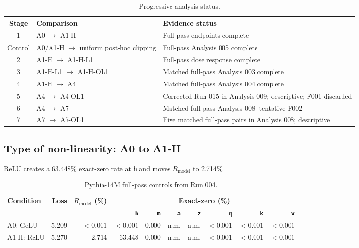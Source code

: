 \documentclass[10pt,a4paper]{article}
\newcommand{\Rmodel}{\ensuremath{R_{\mathrm{model}}}}
\newcommand{\code}[1]{\texttt{#1}}
\begin{document}
{\small
\begin{table}[htbp]
\centering
\caption{Progressive analysis status.}
\label{tab:analysis-status}
\begin{tabularx}{\textwidth}{@{}c p{43mm}Y@{}}
\toprule
\textbf{Stage} & \textbf{Comparison} & \textbf{Evidence status} \\
 & A0 $\rightarrow$ A1-H & Full-pass endpoints complete \\
Control & A0/A1-H $\rightarrow$ uniform post-hoc clipping & Full-pass Analysis 005 complete \\
2 & A1-H $\rightarrow$ A1-H-L1 & Full-pass dose response complete \\
3 & A1-H-L1 $\rightarrow$ A1-H-OL1 & Matched full-pass Analysis 003 complete \\
4 & A1-H $\rightarrow$ A4 & Matched full-pass Analysis 004 complete \\
5 & A4 $\rightarrow$ A4-OL1 & Corrected Run 015 in Analysis 009; descriptive; F001 discarded \\
6 & A4 $\rightarrow$ A7 & Matched full-pass Analysis 008; tentative F002 \\
7 & A7 $\rightarrow$ A7-OL1 & Five matched full-pass pairs in Analysis 008; descriptive \\
\bottomrule
\end{tabularx}
\end{table}}
\FloatBarrier

\subsection{Type of non-linearity: A0 to A1-H}

ReLU creates a 63.448\% exact-zero rate at \code{h} and moves \Rmodel{} to 2.714\%.

{\small
\begin{table}[htbp]
\centering
\caption{Pythia-14M full-pass controls from Run 004.}
\setlength{\tabcolsep}{2.2pt}
\begin{tabular*}{\textwidth}{@{\extracolsep{\fill}}l*{9}{r}@{}}
\toprule
\textbf{Condition} & \textbf{Loss} & \textbf{\Rmodel{} (\%)} & \multicolumn{7}{c}{\textbf{Exact-zero (\%)}} \\
\cmidrule(l){4-10}
& & & \textbf{\code{h}} & \textbf{\code{m}} & \textbf{\code{a}} & \textbf{\code{z}} & \textbf{\code{q}} & \textbf{\code{k}} & \textbf{\code{v}} \\
\midrule
A0: GeLU & 5.209 & $<0.001$ & $<0.001$ & 0.000 & n.m. & n.m. & $<0.001$ & $<0.001$ & $<0.001$ \\
A1-H: ReLU & 5.270 & 2.714 & 63.448 & 0.000 & n.m. & n.m. & $<0.001$ & $<0.001$ & $<0.001$ \\
\bottomrule
\end{tabular*}
\end{table}}
\end{document}
